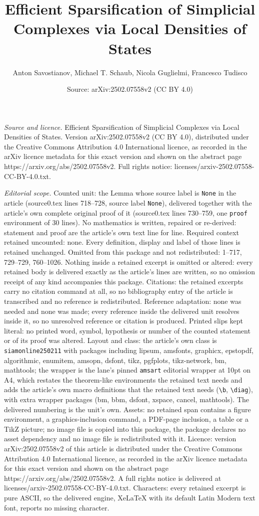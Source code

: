 \documentclass[10pt,a4paper]{amsart}
\title[Efficient Sparsification of Simplicial Complexes via Local D]{Efficient Sparsification of Simplicial Complexes via Local Densities of States}
\author{Anton Savostianov, Michael T. Schaub, Nicola Guglielmi, Francesco Tudisco}
\date{Source: arXiv:2502.07558v2 (CC BY 4.0)}
\begin{document}
\maketitle

\noindent\emph{Source and licence.} Efficient Sparsification of Simplicial Complexes via Local Densities of States. Version arXiv:2502.07558v2 (CC BY 4.0), distributed under the Creative Commons Attribution 4.0 International licence, as recorded in the arXiv licence metadata for this exact version and shown on the abstract page https://arxiv.org/abs/2502.07558v2. Full rights notice: licenses/arxiv-2502.07558-CC-BY-4.0.txt.\par\smallskip

\noindent\textit{Editorial scope.} Counted unit: the Lemma whose source label is \texttt{None} in the article (source0.tex lines 718--728, source label \texttt{None}), delivered together with the article's own complete original proof of it (source0.tex lines 730--759, one \texttt{proof} environment of 30 lines). No mathematics is written, repaired or re-derived: statement and proof are the article's own text line for line. Required context retained uncounted: none. Every definition, display and label of those lines is retained unchanged. Omitted from this package and not redistributed: 1--717, 729--729, 760--1026. Nothing inside a retained excerpt is omitted or altered: every retained body is delivered exactly as the article's lines are written, so no omission receipt of any kind accompanies this package. Citations: the retained excerpts carry no citation command at all, so no bibliography entry of the article is transcribed and no reference is redistributed. Reference adaptation: none was needed and none was made; every reference inside the delivered unit resolves inside it, so no unresolved reference or citation is produced. Printed slips kept literal: no printed word, symbol, hypothesis or number of the counted statement or of its proof was altered. Layout and class: the article's own class is \texttt{siamonline250211} with packages including lipsum, amsfonts, graphicx, epstopdf, algorithmic, enumitem, amsopn, dsfont, tikz, pgfplots, tikz-network, bm, mathtools; the wrapper is the lane's pinned \texttt{amsart} editorial wrapper at 10pt on A4, which restates the theorem-like environments the retained text needs and adds the article's own macro definitions that the retained text needs (\texttt{\textbackslash b}, \texttt{\textbackslash diag}), with extra wrapper packages (bm, bbm, dsfont, xspace, cancel, mathtools). The delivered numbering is the unit's own. Assets: no retained span contains a figure environment, a graphics-inclusion command, a PDF-page inclusion, a table or a TikZ picture; no image file is copied into this package, the package declares no asset dependency and no image file is redistributed with it. Licence: version arXiv:2502.07558v2 of this article is distributed under the Creative Commons Attribution 4.0 International licence, as recorded in the arXiv licence metadata for this exact version and shown on the abstract page https://arxiv.org/abs/2502.07558v2. A full rights notice is delivered at licenses/arxiv-2502.07558-CC-BY-4.0.txt. Characters: every retained excerpt is pure ASCII, so the delivered engine, XeLaTeX with its default Latin Modern text font, reports no missing character.
\end{document}
